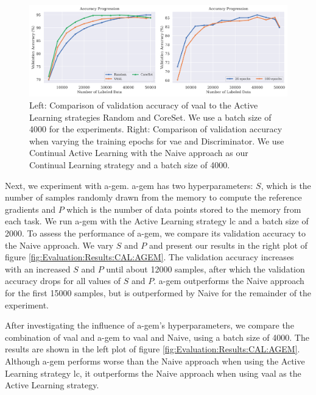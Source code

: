 \begin{figure}[h]
    \centering
    \includegraphics[width=\linewidth]{images/results_CAL/VAAL_plots.png}
    \caption[Continual Active Learning Custom Replay strategy]{Left: Comparison of validation accuracy of \gls{vaal} to the Active Learning strategies Random and CoreSet. We use a batch size of 4000 for the experiments. Right: Comparison of validation accuracy when varying the training 
    epochs for \gls{vae} and Discriminator. We use Continual Active Learning with the Naive approach as our Continual Learning strategy and a batch size of 4000.}
    \label{fig:Evaluation:Results:CAL:VAAL}
\end{figure}

Next, we experiment with \gls{a-gem}. \gls{a-gem} has two hyperparameters: $S$, which is the number of samples randomly drawn from the memory to compute the reference gradients and $P$ which is the number of data points stored to the memory from each task. We run \gls{a-gem} with the Active Learning
strategy \gls{lc} and a batch size of 2000. To assess the performance of \gls{a-gem}, we compare its validation accuracy to the Naive approach. We vary $S$ and $P$ and present our results in the right plot of figure \ref{fig:Evaluation:Results:CAL:AGEM}. The validation accuracy increases with
an increased $S$ and $P$ until about 12000 samples, after which the validation accuracy drops for all values of $S$ and $P$. \gls{a-gem} outperforms the Naive approach for the first 15000 samples, but is outperformed by Naive for the remainder of the experiment. \par
After investigating the influence of \gls{a-gem}'s hyperparameters, we compare the combination of \gls{vaal} and \gls{a-gem} to \gls{vaal} and Naive, using a batch size of 4000. The results are shown in the left plot of figure \ref{fig:Evaluation:Results:CAL:AGEM}. Although \gls{a-gem} performs worse than the Naive
approach when using the Active Learning strategy \gls{lc}, it outperforms the Naive approach when using \gls{vaal} as the Active Learning strategy. \par

